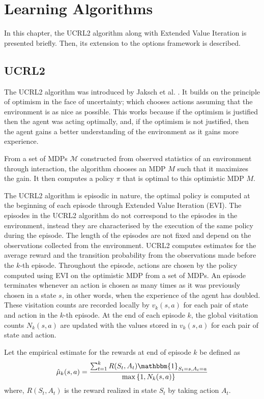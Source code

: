 \chapter{Learning Algorithms}

In this chapter, the UCRL2 algorithm along with Extended Value Iteration is presented briefly.
Then, its extension to the options framework is described.

\section{UCRL2}

The UCRL2 algorithm was introduced by Jaksch et al. \cite{jaksch_near-optimal_2010}.
It builds on the principle of optimism in the face of uncertainty; which chooses actions assuming that the environment is as nice as possible.
This works because if the optimism is justified then the agent was acting optimally, and, if the optimism is not justified, then the agent gains a better understanding of the environment as it gains more experience.

From a set of MDPs $\mathcal{M}$ constructed from observed statistics of an environment through interaction, the algorithm chooses an MDP $M$ such that it maximizes the gain.
It then computes a policy $\pi$ that is optimal to this optimistic MDP $M$.

The UCRL2 algorithm is episodic in nature, the optimal policy is computed at the beginning of each episode through Extended Value Iteration (EVI).
The episodes in the UCRL2 algorithm do not correspond to the episodes in the environment, instead they are characterised by the execution of the same policy during the episode.
The length of the episodes are not fixed and depend on the observations collected from the environment.
UCRL2 computes estimates for the average reward and the transition probability from the observations made before the $k$-th episode.
Throughout the episode, actions are chosen by the policy computed using EVI on the optimistic MDP from a set of MDPs.
An episode terminates whenever an action is chosen as many times as it was previously chosen in a state $s$, in other words, when the experience of the agent has doubled.
These visitation counts are recorded locally by $v_k(s, a)$ for each pair of state and action in the $k$-th episode.
At the end of each episode $k$, the global visitation counts $N_k(s,a)$ are updated with the values stored in $v_k(s, a)$ for each pair of state and action.

Let the empirical estimate for the rewards at end of episode $k$ be defined as  
$$\hat{\mu}_k(s, a) = \frac{\sum_{t=1}^k R(S_t, A_t) \mathbbm{1}_{S_t = s, A_t = a}}{\max\left\{ 1, N_k(s,a) \right\}}$$
where, $R(S_t, A_t)$ is the reward realized in state $S_t$ by taking action $A_t$.


